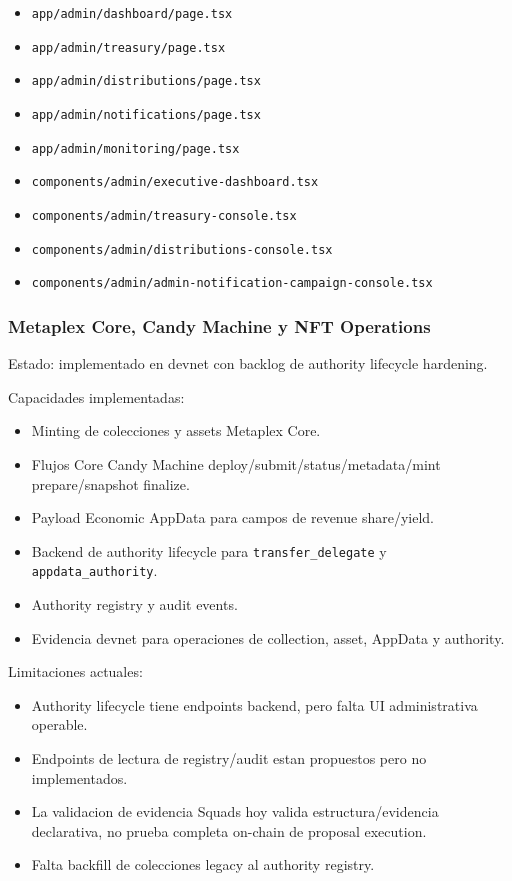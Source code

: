 \documentclass[
  10pt,
  letterpaper,
]{article}
\providecommand{\tightlist}{%
  \setlength{\itemsep}{0pt}\setlength{\parskip}{0pt}}
\let\oldtexttt\texttt
\renewcommand{\texttt}[1]{\oldtexttt{\small #1}}
\begin{document}
\begin{itemize}
\tightlist
\item
  \texttt{app/admin/dashboard/page.tsx}
\item
  \texttt{app/admin/treasury/page.tsx}
\item
  \texttt{app/admin/distributions/page.tsx}
\item
  \texttt{app/admin/notifications/page.tsx}
\item
  \texttt{app/admin/monitoring/page.tsx}
\item
  \texttt{components/admin/executive-dashboard.tsx}
\item
  \texttt{components/admin/treasury-console.tsx}
\item
  \texttt{components/admin/distributions-console.tsx}
\item
  \texttt{components/admin/admin-notification-campaign-console.tsx}
\end{itemize}

\subsubsection{Metaplex Core, Candy Machine y NFT
Operations}\label{metaplex-core-candy-machine-y-nft-operations}

Estado: implementado en devnet con backlog de authority lifecycle
hardening.

Capacidades implementadas:

\begin{itemize}
\tightlist
\item
  Minting de colecciones y assets Metaplex Core.
\item
  Flujos Core Candy Machine deploy/submit/status/metadata/mint
  prepare/snapshot finalize.
\item
  Payload Economic AppData para campos de revenue share/yield.
\item
  Backend de authority lifecycle para \texttt{transfer\_delegate} y
  \texttt{appdata\_authority}.
\item
  Authority registry y audit events.
\item
  Evidencia devnet para operaciones de collection, asset, AppData y
  authority.
\end{itemize}

Limitaciones actuales:

\begin{itemize}
\tightlist
\item
  Authority lifecycle tiene endpoints backend, pero falta UI
  administrativa operable.
\item
  Endpoints de lectura de registry/audit estan propuestos pero no
  implementados.
\item
  La validacion de evidencia Squads hoy valida estructura/evidencia
  declarativa, no prueba completa on-chain de proposal execution.
\item
  Falta backfill de colecciones legacy al authority registry.
\end{itemize}
\end{document}

